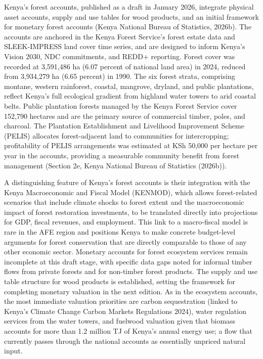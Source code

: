 \documentclass[
  letterpaper,
  DIV=11,
  numbers=noendperiod]{scrartcl}
\begin{document}
Kenya's forest accounts, published as a draft in January 2026, integrate
physical asset accounts, supply and use tables for wood products, and an
initial framework for monetary forest accounts (Kenya National Bureau of
Statistics, 2026b). The accounts are anchored in the Kenya Forest
Service's forest estate data and SLEEK-IMPRESS land cover time series,
and are designed to inform Kenya's Vision 2030, NDC commitments, and
REDD+ reporting. Forest cover was recorded at 3,591,486 ha (6.07 percent
of national land area) in 2024, reduced from 3,934,279 ha (6.65 percent)
in 1990. The six forest strata, comprising montane, western rainforest,
coastal, mangrove, dryland, and public plantations, reflect Kenya's full
ecological gradient from highland water towers to arid coastal belts.
Public plantation forests managed by the Kenya Forest Service cover
152,790 hectares and are the primary source of commercial timber, poles,
and charcoal. The Plantation Establishment and Livelihood Improvement
Scheme (PELIS) allocates forest-adjacent land to communities for
intercropping; profitability of PELIS arrangements was estimated at KSh
50,000 per hectare per year in the accounts, providing a measurable
community benefit from forest management (Section 2e, Kenya National
Bureau of Statistics (2026b)).

A distinguishing feature of Kenya's forest accounts is their integration
with the Kenya Macroeconomic and Fiscal Model (KENMOD), which allows
forest-related scenarios that include climate shocks to forest extent
and the macroeconomic impact of forest restoration investments, to be
translated directly into projections for GDP, fiscal revenues, and
employment. This link to a macro-fiscal model is rare in the AFE region
and positions Kenya to make concrete budget-level arguments for forest
conservation that are directly comparable to those of any other economic
sector. Monetary accounts for forest ecosystem services remain
incomplete at this draft stage, with specific data gaps noted for
informal timber flows from private forests and for non-timber forest
products. The supply and use table structure for wood products is
established, setting the framework for completing monetary valuation in
the next edition. As in the ecosystem accounts, the most immediate
valuation priorities are carbon sequestration (linked to Kenya's Climate
Change Carbon Markets Regulations 2024), water regulation services from
the water towers, and fuelwood valuation given that biomass accounts for
more than 1.2 million TJ of Kenya's annual energy use; a flow that
currently passes through the national accounts as essentially unpriced
natural input.
\end{document}
